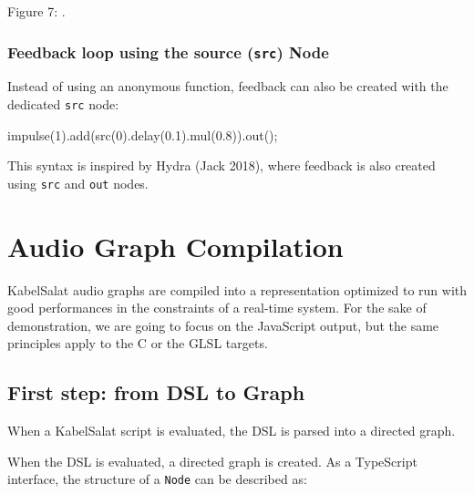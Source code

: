 \documentclass[11pt,]{article}
\makeatletter
\newenvironment{Shaded}{}{}
\newcommand{\DecValTok}[1]{\textcolor[rgb]{0.25,0.63,0.44}{#1}}
\newcommand{\FloatTok}[1]{\textcolor[rgb]{0.25,0.63,0.44}{#1}}
\newcommand{\FunctionTok}[1]{\textcolor[rgb]{0.02,0.16,0.49}{#1}}
\newcommand{\NormalTok}[1]{#1}
\newcommand{\OperatorTok}[1]{\textcolor[rgb]{0.40,0.40,0.40}{#1}}
\newcommand*\pandocbounded[1]{%
  \sbox\pandoc@box{#1}%
  \Gscale@div\@tempa{\textheight}{\dimexpr\ht\pandoc@box+\dp\pandoc@box\relax}%
  \Gscale@div\@tempb{\linewidth}{\wd\pandoc@box}%
  \ifdim\@tempb\p@<\@tempa\p@\let\@tempa\@tempb\fi%
  \ifdim\@tempa\p@<\p@\scalebox{\@tempa}{\usebox\pandoc@box}%
  \else\usebox{\pandoc@box}%
  \fi%
}
\makeatother
\begin{document}
Figure 7: .

\pandocbounded{}

\subsubsection{\texorpdfstring{Feedback loop using the source
(\texttt{src})
Node}{Feedback loop using the source (src) Node}}\label{feedback-loop-using-the-source-src-node}

Instead of using an anonymous function, feedback can also be created
with the dedicated \texttt{src} node:

\begin{Shaded}
\begin{Highlighting}[]
\FunctionTok{impulse}\NormalTok{(}\DecValTok{1}\NormalTok{)}\OperatorTok{.}\FunctionTok{add}\NormalTok{(}\FunctionTok{src}\NormalTok{(}\DecValTok{0}\NormalTok{)}\OperatorTok{.}\FunctionTok{delay}\NormalTok{(}\FloatTok{0.1}\NormalTok{)}\OperatorTok{.}\FunctionTok{mul}\NormalTok{(}\FloatTok{0.8}\NormalTok{))}\OperatorTok{.}\FunctionTok{out}\NormalTok{()}\OperatorTok{;}
\end{Highlighting}
\end{Shaded}

This syntax is inspired by Hydra (Jack 2018), where feedback is also
created using \texttt{src} and \texttt{out} nodes.

\section{Audio Graph Compilation}\label{audio-graph-compilation}

KabelSalat audio graphs are compiled into a representation optimized to
run with good performances in the constraints of a real-time system. For
the sake of demonstration, we are going to focus on the JavaScript
output, but the same principles apply to the C or the GLSL targets.

\subsection{First step: from DSL to
Graph}\label{first-step-from-dsl-to-graph}

When a KabelSalat script is evaluated, the DSL is parsed into a directed
graph.

When the DSL is evaluated, a directed graph is created. As a TypeScript
interface, the structure of a \texttt{Node} can be described as:
\end{document}
